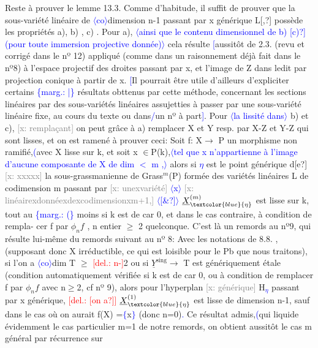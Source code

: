 \documentclass[11pt]{article}
\newcommand{\scanpage}[1]{\par\bigskip\noindent{\small\sffamily[scan #1]}\par}
\newcommand{\mspage}[1]{{\small\sffamily[p.\,#1]}}
\newcommand{\hand}[1]{\textcolor{blue}{#1}}
\newcommand{\inserted}[2][]{\textcolor{blue}{$\langle$#2$\rangle$}}
\newcommand{\margin}[1]{\textcolor{blue}{\{\textsf{marg.:} #1\}}}
\newcommand{\deleted}[1]{\textcolor{red}{[\textsf{del.:} #1]}}
\newcommand{\xout}[1]{\textcolor{gray}{[\textsf{x:} #1]}}
\newcommand{\unsure}[1]{[#1?]}
\begin{document}
\clearpage
\scanpage{25/79}
\mspage{\hand{74}}

Reste à prouver le lemme 13.3.  Comme d'habitude, il suffit de prouver
que  la sous-variété linéaire de \inserted{co}dimension n-1  passant par x générique
L\unsure{,}  possède les propriétés  a), b) , c) .  Pour  a), \inserted{ainsi que le contenu dimensionnel de b) \unsure{c)} (pour toute immersion projective donnée)} cela résulte
\hand{[}aussitôt de 2.3. (revu et corrigé dans le nº 12)  appliqué (comme dans un
raisonnement déjà fait dans le nº8) à l'espace projectif  des droites
passant par x, et l'image de Z dans ledit par projection conique à
partir de x. \hand{[}Il pourrait être utile d'ailleurs d'expliciter certains
\margin{|} résultats obttenus par cette méthode, concernant les sections linéaires
par des sous-variétés linéaires assujetties à passer par une sous-variété
linéaire fixe,  au cours du texte ou dans\hand{/}un nº à part\hand{]}.  Pour \inserted{la lissité dans} b) et c),
\xout{remplaçant} on peut grâce à a)  remplacer X et Y  resp. par X-Z et Y-Z
qui sont lisses, et on est  ramené à prouver ceci:  Soit f: X$\rightarrow$ P un
morphisme non ramifié,\hand{(}avec X lisse sur k, et soit  x $\in$P(k),\inserted{tel que x n'appartienne à l'image d'aucune composante de X de dim $<$ m ,} alors si
\hand{$\eta$} est le point générique  d\unsure{e} \xout{xxxxx} la sous-grassmanienne  de Grass$^{m}$(P)
formée des variétés linéaires L de codimension m passant par \xout{unexvariété} \inserted{x}
\xout{linéairexdonnéexdexcodimensionxm+1,} \inserted{\unsure{\&}} $\underline{X}^{(m)}_{\hand{\eta}}$ est  lisse sur k, tout au
\margin{(} moins si k est de car 0, et dans le cas contraire, à condition de rempla-%
cer f par $\phi_{n}f$ , n entier $\geq$ 2 quelconque.  C'est là  un remords au nº9,
qui résulte lui-même du remords suivant au nº 8:  Avec les notations de
8.8. , (supposant donc X irréductible, ce qui est loisible pour le Pb
que nous traitons), si  l'on a \inserted{co}dim T $\geq$ \deleted{n-}2  ou si  $\underline{Y}^{\text{sing}}\rightarrow$ T  est
génériquement étale (condition automatiquement vérifiée si k est de car 0,
ou à condition de remplacer f par $\phi_{n}f$ avec n$\geq$2, cf nº 9), alors pour
l'hyperplan \xout{générique} H\hand{$_{\eta}$} passant par x  générique, \deleted{\unsure{on a}} $\underline{X}^{(1)}_{\hand{\eta}}$ est lisse
de dimension n-1,  sauf dans le cas  où  on aurait  f(X) =\hand{$\{$}x\hand{$\}$}  (donc n=0)\hand{.}
Ce résultat admis,\hand{(}qui liquide évidemment le cas particulier m=1 de
notre remords, on obtient aussitôt le cas  m général  par récurrence sur
\end{document}
